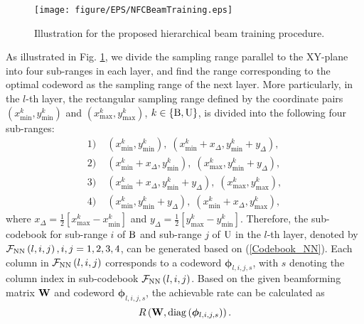 \documentclass[lettersize, journal]{IEEEtran}
\begin{document}
\begin{figure}[t]
\begin{center}
\texttt{[image: figure/EPS/NFCBeamTraining.eps]}
\caption{Illustration for the proposed hierarchical beam training procedure.}
\label{NFCBeamTraining}
\end{center}
\end{figure}


As illustrated in Fig. {\ref{NFCBeamTraining}}, we divide the sampling range parallel to the XY-plane into four sub-ranges in each layer, and find the range corresponding to the optimal codeword as the sampling range of the next layer.
More particularly, in the $l$-th layer, the rectangular sampling range defined by the coordinate pairs $\left( x^k_{\min}, y^k_{\min} \right)$ and $\left( x^k_{\max}, y^k_{\max} \right)$, $k \in \left\{ {\rm{B}}, {\rm{U}} \right\}$, is divided into the following four sub-ranges:
\begin{subequations}\label{SubRange}
\begin{align}
1) \; & \left( x^k_{\min}, y^k_{\min} \right), \; \left( x^k_{\min} + x_{\Delta}, y^k_{\min} + y_{\Delta}  \right), \\
2) \; & \left( x^k_{\min} + x_{\Delta} , y^k_{\min} \right),  \; \left( x^k_{\max}, y^k_{\min} + y_{\Delta}  \right), \\
3) \; & \left( x^k_{\min} + x_{\Delta} , y^k_{\min} + y_{\Delta}  \right), \; \left( x^k_{\max}, y^k_{\max}  \right), \\
4) \; & \left( x^k_{\min} , y^k_{\min} + y_{\Delta} \right),  \; \left( x^k_{\min} + x_{\Delta} , y^k_{\max}  \right),
\end{align}
\end{subequations}
where $x_{\Delta} = \frac{1}{2}\left[x^k_{\max}- x^k_{\min} \right]$ and $y_{\Delta} = \frac{1}{2}\left[y^k_{\max}- y^k_{\min} \right]$.
Therefore, the sub-codebook for sub-range $i$ of ${\rm{B}}$ and sub-range $j$ of ${\rm{U}}$ in the $l$-th layer, denoted by ${\cal{F}}_{\rm{NN}} \left( l, i, j \right), i, j =1,2,3,4$, can be generated based on ({\ref{Codebook_NN}}).
Each column in ${\cal{F}}_{\rm{NN}} \left( l, i, j \right)$ corresponds to a codeword ${\bm{\phi }}_{l, i, j, s}$, with $s$ denoting the column index in sub-codebook ${\cal{F}}_{\rm{NN}} \left( l, i, j \right)$. 
Based on the given beamforming matrix ${\bf{W}}$ and codeword ${\bm{\phi }}_{l, i, j, s}$,  the achievable rate can be calculated as 
\begin{equation} R \left( {\bf{W}}, {\rm{diag}}\left( {\bm{\phi }}_{l, i, j, s} \right) \right). \end{equation} 
\end{document}
